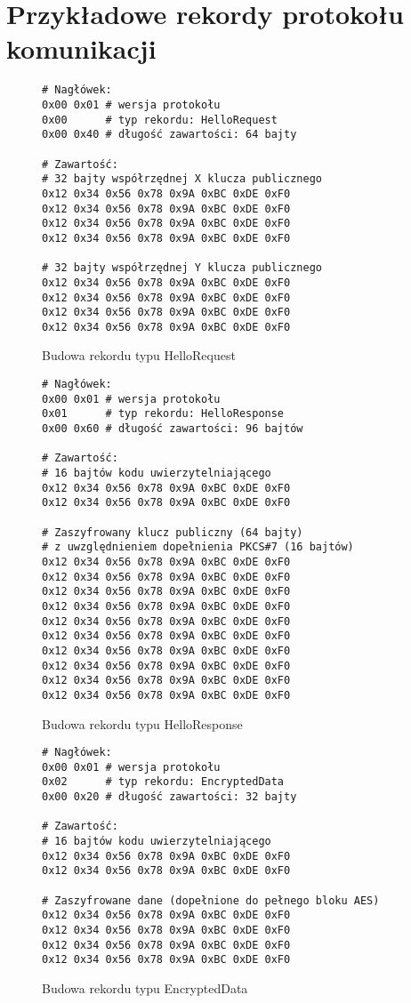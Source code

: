 \chapter{Przykładowe rekordy protokołu komunikacji}
\label{app:samplerecords}

\begin{figure}[h]
\centering
\begin{BVerbatim}
# Nagłówek:
0x00 0x01 # wersja protokołu
0x00      # typ rekordu: HelloRequest
0x00 0x40 # długość zawartości: 64 bajty

# Zawartość:
# 32 bajty współrzędnej X klucza publicznego
0x12 0x34 0x56 0x78 0x9A 0xBC 0xDE 0xF0
0x12 0x34 0x56 0x78 0x9A 0xBC 0xDE 0xF0
0x12 0x34 0x56 0x78 0x9A 0xBC 0xDE 0xF0
0x12 0x34 0x56 0x78 0x9A 0xBC 0xDE 0xF0

# 32 bajty współrzędnej Y klucza publicznego
0x12 0x34 0x56 0x78 0x9A 0xBC 0xDE 0xF0
0x12 0x34 0x56 0x78 0x9A 0xBC 0xDE 0xF0
0x12 0x34 0x56 0x78 0x9A 0xBC 0xDE 0xF0
0x12 0x34 0x56 0x78 0x9A 0xBC 0xDE 0xF0
\end{BVerbatim}
\caption{Budowa rekordu typu HelloRequest}
\label{fig:hellorequestsample}
\end{figure}

\begin{figure}
\centering
\begin{BVerbatim}
# Nagłówek:
0x00 0x01 # wersja protokołu
0x01      # typ rekordu: HelloResponse
0x00 0x60 # długość zawartości: 96 bajtów

# Zawartość:
# 16 bajtów kodu uwierzytelniającego
0x12 0x34 0x56 0x78 0x9A 0xBC 0xDE 0xF0
0x12 0x34 0x56 0x78 0x9A 0xBC 0xDE 0xF0

# Zaszyfrowany klucz publiczny (64 bajty)
# z uwzględnieniem dopełnienia PKCS#7 (16 bajtów)
0x12 0x34 0x56 0x78 0x9A 0xBC 0xDE 0xF0
0x12 0x34 0x56 0x78 0x9A 0xBC 0xDE 0xF0
0x12 0x34 0x56 0x78 0x9A 0xBC 0xDE 0xF0
0x12 0x34 0x56 0x78 0x9A 0xBC 0xDE 0xF0
0x12 0x34 0x56 0x78 0x9A 0xBC 0xDE 0xF0
0x12 0x34 0x56 0x78 0x9A 0xBC 0xDE 0xF0
0x12 0x34 0x56 0x78 0x9A 0xBC 0xDE 0xF0
0x12 0x34 0x56 0x78 0x9A 0xBC 0xDE 0xF0
0x12 0x34 0x56 0x78 0x9A 0xBC 0xDE 0xF0
0x12 0x34 0x56 0x78 0x9A 0xBC 0xDE 0xF0
\end{BVerbatim}
\caption{Budowa rekordu typu HelloResponse}
\label{fig:helloresponsesample}
\end{figure}

\begin{figure}
\centering
\begin{BVerbatim}
# Nagłówek:
0x00 0x01 # wersja protokołu
0x02      # typ rekordu: EncryptedData
0x00 0x20 # długość zawartości: 32 bajty

# Zawartość:
# 16 bajtów kodu uwierzytelniającego
0x12 0x34 0x56 0x78 0x9A 0xBC 0xDE 0xF0
0x12 0x34 0x56 0x78 0x9A 0xBC 0xDE 0xF0

# Zaszyfrowane dane (dopełnione do pełnego bloku AES)
0x12 0x34 0x56 0x78 0x9A 0xBC 0xDE 0xF0
0x12 0x34 0x56 0x78 0x9A 0xBC 0xDE 0xF0
0x12 0x34 0x56 0x78 0x9A 0xBC 0xDE 0xF0
0x12 0x34 0x56 0x78 0x9A 0xBC 0xDE 0xF0
\end{BVerbatim}
\caption{Budowa rekordu typu EncryptedData}
\label{fig:encrypteddatasample}
\end{figure}
